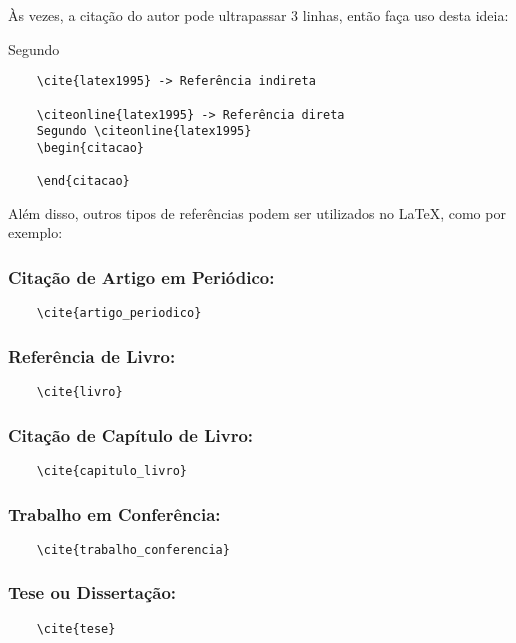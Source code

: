 Às vezes, a citação do autor pode ultrapassar 3 linhas, então faça uso desta ideia:
\begin{citacao}
    Segundo 
    \lipsum[59]
\end{citacao}

\begin{verbatim}
    \cite{latex1995} -> Referência indireta
    
    \citeonline{latex1995} -> Referência direta            
    Segundo \citeonline{latex1995}
    \begin{citacao}
        
    \end{citacao}
\end{verbatim}

Além disso, outros tipos de referências podem ser utilizados no LaTeX, como por exemplo:

\subsubsection{Citação de Artigo em Periódico:}
\begin{verbatim}
    \cite{artigo_periodico}
\end{verbatim}
\cite{artigo_periodico}

\subsubsection{Referência de Livro:}
\begin{verbatim}
    \cite{livro}
\end{verbatim}
\cite{livro}

\subsubsection{Citação de Capítulo de Livro:}
\begin{verbatim}
    \cite{capitulo_livro}
\end{verbatim}
\cite{capitulo_livro}

\subsubsection{Trabalho em Conferência:}
\begin{verbatim}
    \cite{trabalho_conferencia}
\end{verbatim}
\cite{trabalho_conferencia}

\subsubsection{Tese ou Dissertação:}
\begin{verbatim}
    \cite{tese}
\end{verbatim}
\cite{tese}


